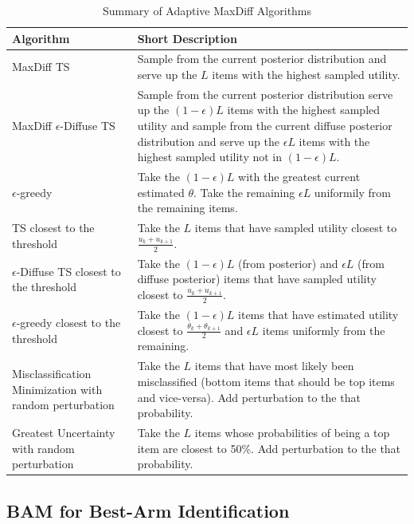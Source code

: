 \documentclass[a4paper,12pt]{article}
\newcommand{\numperset}{L}
\begin{document}
\begin{table}[ht]
\caption{Summary of Adaptive MaxDiff Algorithms}
\begin{tabular}{p{5cm}|p{11cm}}
Algorithm & Short Description \\
\hline
MaxDiff TS & Sample from the current posterior distribution and serve up the $\numperset$ items with the highest sampled utility.\\
MaxDiff $\epsilon$-Diffuse TS & Sample from the current posterior distribution serve up the $(1-\epsilon)L$ items with the highest sampled utility and sample from the current diffuse posterior distribution and serve up the $\epsilon L$ items with the highest sampled utility not in $(1-\epsilon)L$.\\
$\epsilon$-greedy & Take the $(1-\epsilon)L$ with the greatest current estimated $\theta$. Take the remaining $\epsilon L$ uniformily from the remaining items.\\
TS closest to the threshold & Take the $\numperset$ items that have sampled utility closest to $\frac{u_k+u_{k+1}}{2}$.\\
$\epsilon$-Diffuse TS closest to the threshold & Take the $(1-\epsilon)L$ (from posterior) and  $\epsilon L$ (from diffuse posterior) items that have sampled utility closest to $\frac{u_k+u_{k+1}}{2}$.\\
$\epsilon$-greedy closest to the threshold & Take the $(1-\epsilon)L$ items that have estimated utility closest to $\frac{\theta_k+\theta_{k+1}}{2}$ and $\epsilon L$ items uniformly from the remaining.\\
Misclassification Minimization with random perturbation& Take the $\numperset$ items that have most likely been misclassified (bottom items that should be top items and vice-versa). Add perturbation to the that probability.\\
Greatest Uncertainty with random perturbation& Take the $\numperset$ items whose probabilities of being a top item are closest to 50\%. Add perturbation to the that probability.\\
\end{tabular}
\label{methods}
\end{table}



\subsection{BAM for Best-Arm Identification}
\end{document}
